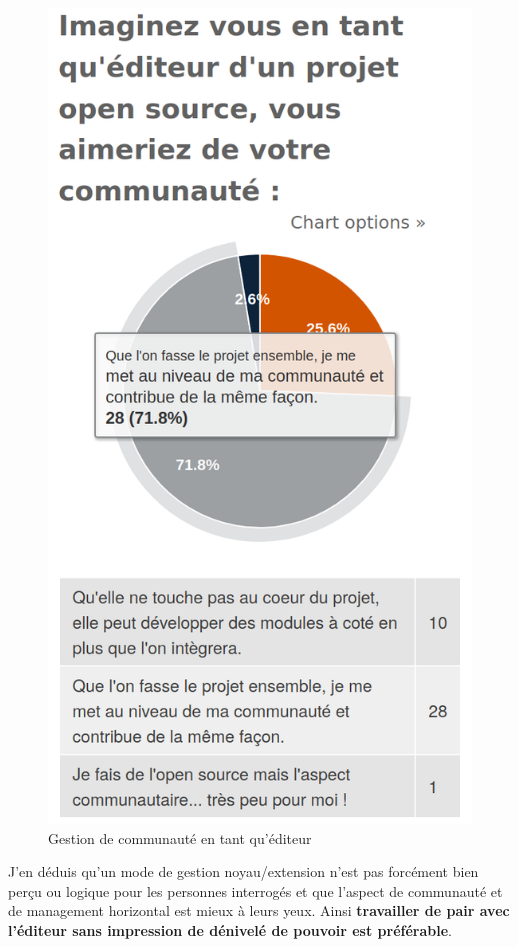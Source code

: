 			\begin{figure}[!htb]
				\center
				\includegraphics[scale=0.28]{./img/communaute}
				\caption{Gestion de communauté en tant qu'éditeur}
			\end{figure}

			J'en déduis qu'un mode de gestion noyau/extension n'est pas forcément bien perçu ou logique pour les personnes interrogés et que l'aspect de communauté et de management horizontal est mieux à leurs yeux. Ainsi \textbf{travailler de pair avec l'éditeur sans impression de dénivelé de pouvoir est préférable}.

